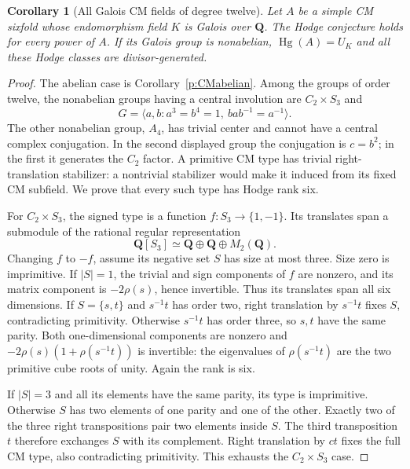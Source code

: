 \documentclass[11pt,reqno]{article}
\theoremstyle{emphasizedplain}
\newtheorem{corollary}[theorem]{Corollary}
\theoremstyle{emphasizeddefinition}
\theoremstyle{emphasizeddefinition}
\DeclareMathOperator{\Hg}{Hg}
\newcommand{\Q}{\mathbf Q}
\begin{document}
\begin{corollary}[All Galois CM fields of degree twelve]
\label{p:CMgalois}
Let $A$ be a simple CM sixfold whose endomorphism field $K$ is Galois
over $\Q$. The Hodge conjecture holds for every power of $A$.
If its Galois group is nonabelian, $\Hg(A)=U_K$ and all these
Hodge classes are divisor-generated.
\end{corollary}
\begin{proof}
The abelian case is Corollary~\ref{p:CMabelian}. Among the groups of
order twelve, the nonabelian groups having a central involution are
$C_2\times S_3$ and
\[
 G=\langle a,b:a^3=b^4=1,\ bab^{-1}=a^{-1}\rangle.
\]
The other nonabelian group, $A_4$, has trivial center and cannot have
a central complex conjugation. In the second displayed group the
conjugation is $c=b^2$; in the first it generates the $C_2$ factor.
A primitive CM type has trivial right-translation stabilizer: a
nontrivial stabilizer would make it induced from its fixed CM subfield.
We prove that every such type has Hodge rank six.

For $C_2\times S_3$, the signed type is a function
$f:S_3\to\{1,-1\}$. Its translates span a submodule of the rational
regular representation
\[
 \Q[S_3]\simeq\Q\oplus\Q\oplus M_2(\Q).
\]
Changing $f$ to $-f$, assume its negative set $S$ has size at most
three. Size zero is imprimitive. If $|S|=1$, the trivial and sign
components of $f$ are nonzero, and its matrix component is
$-2\rho(s)$, hence invertible. Thus its translates span all six
dimensions. If $S=\{s,t\}$ and $s^{-1}t$ has order two, right
translation by $s^{-1}t$ fixes $S$, contradicting primitivity.
Otherwise $s^{-1}t$ has order three, so $s,t$ have the same parity.
Both one-dimensional components are nonzero and
$-2\rho(s)(1+\rho(s^{-1}t))$ is invertible: the eigenvalues of
$\rho(s^{-1}t)$ are the two primitive cube roots of unity.
Again the rank is six.

If $|S|=3$ and all its elements have the same parity, its type is
imprimitive. Otherwise $S$ has two elements of one parity and one
of the other. Exactly two of the three right transpositions pair
two elements inside $S$. The third transposition $t$ therefore
exchanges $S$ with its complement. Right translation by $ct$ fixes
the full CM type, also contradicting primitivity. This exhausts
the $C_2\times S_3$ case.


\end{proof}
\end{document}
